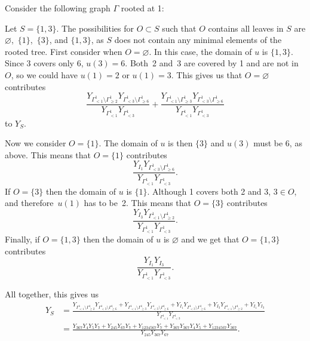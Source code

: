 \documentclass[pdftex]{sigma}
\numberwithin{equation}{section}
\begin{document}
\begin{Example}Consider the following graph $\Gamma$ rooted at 1:
\begin{center}
\end{center}

Let $S=\{1,3\}$. The possibilities for $O\subset S$ such that $O$ contains all leaves in $S$ are $\varnothing$,~$\{1\}$,~$\{3\}$, and $\{1,3\}$, as $S$ does not contain any minimal elements of the rooted tree. First consider when $O=\varnothing$. In this case, the domain of $u$ is $\{1,3\}$. Since 3 covers only 6, $u(3)=6$. Both~2 and~3 are covered by 1 and are not in $O$, so we could have $u(1)=2$ or $u(1)=3$. This gives us that $O=\varnothing$ contributes
\[ \frac{Y_{\Gamma_{< 1}^1\setminus\Gamma_{\geq 2}^1}Y_{\Gamma_{< 3}^1\setminus\Gamma_{\geq 6}^1}}{Y_{\Gamma_{< 1}^1}Y_{\Gamma_{< 3}^1}}+\frac{Y_{\Gamma_{< 1}^1\setminus\Gamma_{\geq 3}^1}Y_{\Gamma_{< 3}^1\setminus\Gamma_{\geq 6}^1}}{Y_{\Gamma_{< 1}^1}Y_{\Gamma_{< 3}^1}}\]
to $Y_S$.

Now we consider $O=\{1\}$. The domain of $u$ is then $\{3\}$ and $u(3)$ must be 6, as above. This means that $O=\{1\}$ contributes \[ \frac{Y_{I_1}Y_{\Gamma_{< 3}^1\setminus\Gamma_{\geq 6}^1}}{Y_{\Gamma_{< 1}^1}Y_{\Gamma_{< 3}^1}}.\]
If $O=\{3\}$ then the domain of $u$ is $\{1\}$. Although 1 covers both 2 and 3, $3\in O$, and therefore~$u(1)$ has to be~2. This means that $O=\{3\}$ contributes
\[ \frac{Y_{I_3}Y_{\Gamma_{< 1}^1\setminus\Gamma_{\geq 2}^1}}{Y_{\Gamma_{< 1}^1}Y_{\Gamma_{< 3}^1}}.\]
Finally, if $O=\{1,3\}$ then the domain of $u$ is $\varnothing$ and we get that $O=\{1,3\}$ contributes \[ \frac{Y_{I_1}Y_{I_3}}{Y_{\Gamma_{< 1}^1}Y_{\Gamma_{< 3}^1}}.\]

All together, this gives us
\begin{align*}
Y_S&=\frac{Y_{\Gamma_{< 1}^1\setminus\Gamma_{\geq 2}^1}Y_{\Gamma_{< 3}^1\setminus\Gamma_{\geq 6}^1}+Y_{\Gamma_{< 1}^1\setminus\Gamma_{\geq 3}^1}Y_{\Gamma_{< 3}^1\setminus\Gamma_{\geq 6}^1}+Y_{I_1}Y_{\Gamma_{< 3}^1\setminus\Gamma_{\geq 6}^1}+Y_{I_3}Y_{\Gamma_{< 1}^1\setminus\Gamma_{\geq 2}^1}+Y_{I_1}Y_{I_3}}{Y_{\Gamma_{< 1}^1}Y_{\Gamma_{< 3}^1}}\\
&=\frac{Y_{367}Y_4Y_5Y_7+Y_{245}Y_{67}Y_7+Y_{1234567}Y_7+Y_{367}Y_{367}Y_4Y_5+Y_{1234567}Y_{367}}{Y_{245}Y_{367}Y_{67}}.
\end{align*}
\end{Example}
\end{document}

